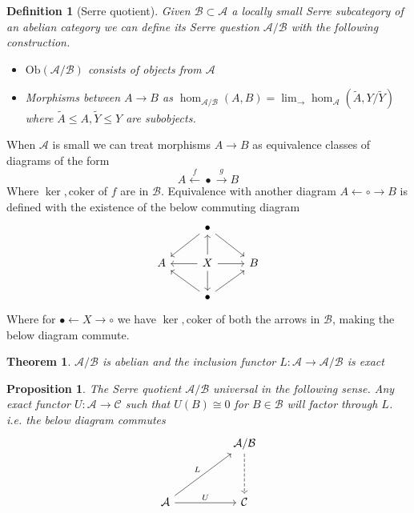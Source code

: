\documentclass[12pt]{article}
\numberwithin{equation}{section}
\newcounter{dummy} \numberwithin{dummy}{section}
\newtheorem{theorem}[dummy]{Theorem}
\newtheorem{definition}[dummy]{Definition}
\newtheorem{proposition}[dummy]{Proposition}
\begin{document}
	\begin{definition}[Serre quotient]
		Given $\mathcal{B} \subset \mathcal{A}$ a locally small Serre subcategory of an abelian category we can define its Serre question $\mathcal{A}/\mathcal{B}$ with the following construction. \begin{itemize}
			\item $\mathrm{Ob}(\mathcal{A}/\mathcal{B})$ consists of objects from $\mathcal{A}$
			\item Morphisms between $A\to B$ as $\hom_{\mathcal{A}/\mathcal{B}} (A,B) =  \lim_\to \hom_\mathcal{A} (\tilde A, Y/\tilde Y)$ where $\tilde A \leq A, \tilde Y \leq Y$ are subobjects.
		\end{itemize}
	\end{definition}
	When $\mathcal{A}$ is small we can treat morphisms $A \to B $ as equivalence classes of diagrams of the form \[ A \xleftarrow{f} \bullet \xrightarrow{g} B \]
	Where $\ker, \mathrm{coker}$ of $f$ are in $\mathcal{B}$. Equivalence with another diagram $A \leftarrow \circ \rightarrow B$ is defined with the existence of the below commuting diagram
	\[\begin{tikzcd}
		& \bullet \\
		A & X & B \\
		& \bullet
		\arrow[from=1-2, to=2-1]
		\arrow[from=1-2, to=2-3]
		\arrow[from=2-2, to=1-2]
		\arrow[from=2-2, to=2-1]
		\arrow[from=2-2, to=2-3]
		\arrow[from=2-2, to=3-2]
		\arrow[from=3-2, to=2-1]
		\arrow[from=3-2, to=2-3]
	\end{tikzcd}\]
	Where for $\bullet \leftarrow X \rightarrow \circ $ we have $\ker,\mathrm{coker}$ of both the arrows in $\mathcal{B}$, making the below diagram commute.
	
	
	
	\begin{theorem}
		$\mathcal{A/B}$ is abelian and the inclusion functor $L:\mathcal{A} \to \mathcal{A/B}$ is exact
	\end{theorem}
	\begin{proposition}
		The Serre quotient $\mathcal{A/B}$ universal in the following sense. Any exact functor $U: \mathcal{A} \to \mathcal{C}$ such that $U(B)\cong 0$ for $B \in \mathcal{B}$ will factor through $L$. i.e. the below diagram commutes	
		\[\begin{tikzcd}
			&& {\mathcal{A/B}} \\
			\\
			{\mathcal{A}} && {\mathcal{C}}
			\arrow[dashed, from=1-3, to=3-3]
			\arrow["L", from=3-1, to=1-3]
			\arrow["U", from=3-1, to=3-3]
		\end{tikzcd}\]
	\end{proposition}
	
\end{document}
